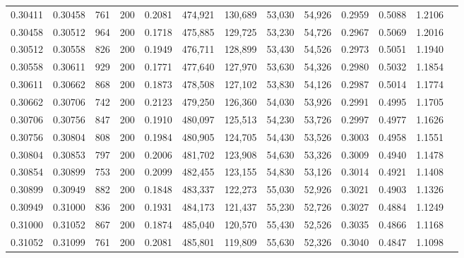 \begin{tabular}{rrrrrrrrrrrrr}
0.30411 & 0.30458 &   761 & 200 &                                     0.2081 & 474,921 & 130,689 &  53,030 &  54,926 & 0.2959 & 0.5088 & 1.2106 \\
0.30458 & 0.30512 &   964 & 200 &                                     0.1718 & 475,885 & 129,725 &  53,230 &  54,726 & 0.2967 & 0.5069 & 1.2016 \\
0.30512 & 0.30558 &   826 & 200 &                                     0.1949 & 476,711 & 128,899 &  53,430 &  54,526 & 0.2973 & 0.5051 & 1.1940 \\
0.30558 & 0.30611 &   929 & 200 &                                     0.1771 & 477,640 & 127,970 &  53,630 &  54,326 & 0.2980 & 0.5032 & 1.1854 \\
0.30611 & 0.30662 &   868 & 200 &                                     0.1873 & 478,508 & 127,102 &  53,830 &  54,126 & 0.2987 & 0.5014 & 1.1774 \\
0.30662 & 0.30706 &   742 & 200 &                                     0.2123 & 479,250 & 126,360 &  54,030 &  53,926 & 0.2991 & 0.4995 & 1.1705 \\
0.30706 & 0.30756 &   847 & 200 &                                     0.1910 & 480,097 & 125,513 &  54,230 &  53,726 & 0.2997 & 0.4977 & 1.1626 \\
0.30756 & 0.30804 &   808 & 200 &                                     0.1984 & 480,905 & 124,705 &  54,430 &  53,526 & 0.3003 & 0.4958 & 1.1551 \\
0.30804 & 0.30853 &   797 & 200 &                                     0.2006 & 481,702 & 123,908 &  54,630 &  53,326 & 0.3009 & 0.4940 & 1.1478 \\
0.30854 & 0.30899 &   753 & 200 &                                     0.2099 & 482,455 & 123,155 &  54,830 &  53,126 & 0.3014 & 0.4921 & 1.1408 \\
0.30899 & 0.30949 &   882 & 200 &                                     0.1848 & 483,337 & 122,273 &  55,030 &  52,926 & 0.3021 & 0.4903 & 1.1326 \\
0.30949 & 0.31000 &   836 & 200 &                                     0.1931 & 484,173 & 121,437 &  55,230 &  52,726 & 0.3027 & 0.4884 & 1.1249 \\
0.31000 & 0.31052 &   867 & 200 &                                     0.1874 & 485,040 & 120,570 &  55,430 &  52,526 & 0.3035 & 0.4866 & 1.1168 \\
0.31052 & 0.31099 &   761 & 200 &                                     0.2081 & 485,801 & 119,809 &  55,630 &  52,326 & 0.3040 & 0.4847 & 1.1098 \\

\end{tabular}
